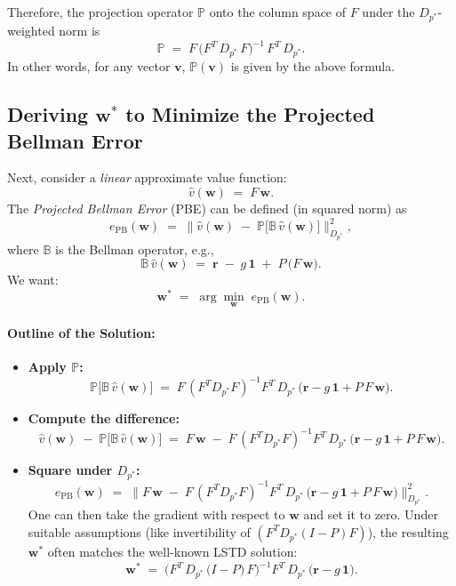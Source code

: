 Therefore, the projection operator $\mathbb{P}$ onto the column space of $F$ under the $D_{p^*}$-weighted norm is
\[
\boxed{
\mathbb{P} 
\;=\; 
F\,\bigl(F^T\,D_{p^*}\,F\bigr)^{-1}\,F^T\,D_{p^*}.
}
\]
In other words, for any vector $\boldsymbol{v}$, $\mathbb{P}(\boldsymbol{v})$ is given by the above formula.


\subsection{Deriving \texorpdfstring{$\boldsymbol{w}^*$}{w*} to Minimize the Projected Bellman Error}

Next, consider a \emph{linear} approximate value function:
\[
\hat{v}(\boldsymbol{w}) \;=\; F\,\boldsymbol{w}.
\]
The \emph{Projected Bellman Error} (PBE) can be defined (in squared norm) as
\[
e_{\mathrm{PB}}(\boldsymbol{w})
\;=\;
\bigl\|
\hat{v}(\boldsymbol{w}) 
\;-\;
\mathbb{P}\bigl[\mathbb{B}\,\hat{v}(\boldsymbol{w})\bigr]
\bigr\|_{D_{p^*}}^2,
\]
where $\mathbb{B}$ is the Bellman operator, e.g.,
\[
\mathbb{B}\,\hat{v}(\boldsymbol{w})
\;=\;
\boldsymbol{r} \;-\; g\,\mathbf{1}
\;+\;
P\,\bigl(F\,\boldsymbol{w}\bigr).
\]
We want:
\[
\boldsymbol{w}^*
\;=\;
\arg\min_{\boldsymbol{w}}
\;e_{\mathrm{PB}}(\boldsymbol{w}).
\]

\paragraph{Outline of the Solution:}
\begin{itemize}
    \item \textbf{Apply $\mathbb{P}$:} 
    \[
    \mathbb{P}\bigl[\mathbb{B}\,\hat{v}(\boldsymbol{w})\bigr]
    \;=\;
    F\,(F^T D_{p^*} F)^{-1} F^T\,D_{p^*}\,\bigl(\boldsymbol{r} - g\,\mathbf{1} + P\,F\,\boldsymbol{w}\bigr).
    \]
    
    \item \textbf{Compute the difference:}
    \[
    \hat{v}(\boldsymbol{w}) 
    \;-\;
    \mathbb{P}\bigl[\mathbb{B}\,\hat{v}(\boldsymbol{w})\bigr]
    \;=\;
    F\,\boldsymbol{w}
    \;-\;
    F\,(F^T D_{p^*} F)^{-1} F^T\,D_{p^*}\,\bigl(\boldsymbol{r} - g\,\mathbf{1} + P\,F\,\boldsymbol{w}\bigr).
    \]
    
    \item \textbf{Square under $D_{p^*}$:}
    \[
    e_{\mathrm{PB}}(\boldsymbol{w})
    \;=\;
    \bigl\|
    F\,\boldsymbol{w}
    \;-\;
    F\,(F^T D_{p^*} F)^{-1} F^T\,D_{p^*}\,\bigl(\boldsymbol{r} - g\,\mathbf{1} + P\,F\,\boldsymbol{w}\bigr)
    \bigr\|_{D_{p^*}}^2.
    \]
    One can then take the gradient with respect to $\boldsymbol{w}$ and set it to zero. 
    Under suitable assumptions (like invertibility of $(F^T D_{p^*} (I - P) F)$), 
    the resulting $\boldsymbol{w}^*$ often matches the well-known LSTD solution:
    \[
    \boldsymbol{w}^*
    \;=\;
    \bigl(F^T\,D_{p^*}\,\bigl(I - P\bigr)\,F\bigr)^{-1}
    F^T\,D_{p^*}\,\bigl(\boldsymbol{r} - g\,\mathbf{1}\bigr).
    \]
\end{itemize}

